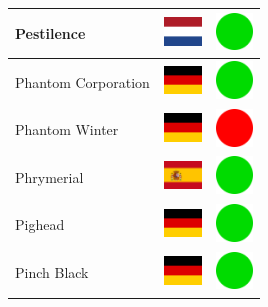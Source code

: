 \documentclass[12pt, a4paper, twoside]{report}
\begin{document}
\begin{center}
\begin{longtable}{|p{5cm}|p{2cm}|p{2cm}|}
Pestilence & \includegraphics[width=1cm]{4x3/nl} & \includegraphics[width=1cm]{likes/y} \\ \hline
Phantom Corporation & \includegraphics[width=1cm]{4x3/de} & \includegraphics[width=1cm]{likes/y} \\ \hline
Phantom Winter & \includegraphics[width=1cm]{4x3/de} & \includegraphics[width=1cm]{likes/n} \\ \hline
Phrymerial & \includegraphics[width=1cm]{4x3/es} & \includegraphics[width=1cm]{likes/y} \\ \hline
Pighead & \includegraphics[width=1cm]{4x3/de} & \includegraphics[width=1cm]{likes/y} \\ \hline
Pinch Black & \includegraphics[width=1cm]{4x3/de} & \includegraphics[width=1cm]{likes/y} \\ \hline

\end{longtable}
\end{center}
\end{document}
